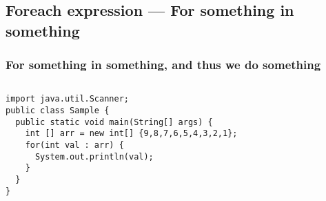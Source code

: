 \documentclass[en, 11pt, xcolor=dvipsnames]{beamer}
\begin{document}
\subsection{Foreach expression --- For something in something}
\begin{frame}[fragile]
	\frametitle{For something in something, and thus we do something}



	\begin{columns}[c]
		\begin{column}{0.9\textwidth}

			\begin{lstlisting}[style=Java]
import java.util.Scanner;
public class Sample {
  public static void main(String[] args) {
    int [] arr = new int[] {9,8,7,6,5,4,3,2,1};
    for(int val : arr) {
      System.out.println(val);
    }
  }
}\end{lstlisting}

		\end{column}
	\end{columns}

\end{frame}
\end{document}
